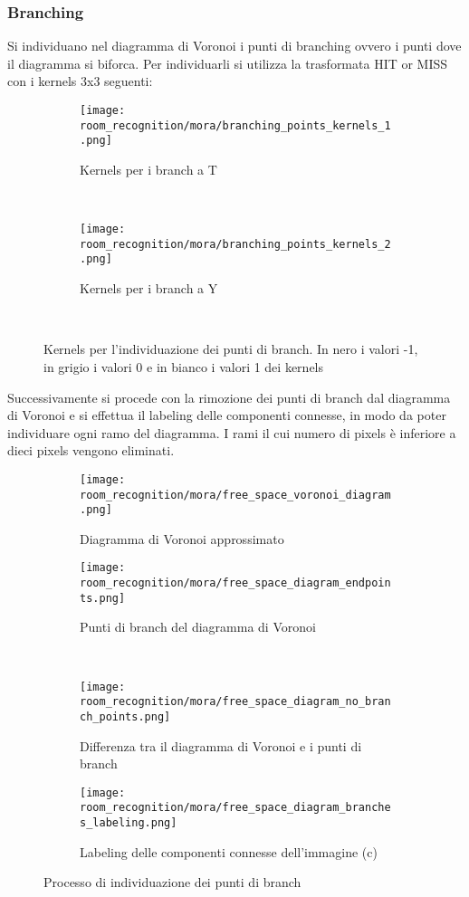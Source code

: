 \subsubsection{Branching}
Si individuano nel diagramma di Voronoi i punti di branching ovvero i punti dove il diagramma si biforca. Per individuarli si utilizza la trasformata HIT or MISS con i kernels 3x3 seguenti:
\begin{figure}[H]
  \centering
  \begin{subfigure}[t]{\textwidth}
    \centering
    \texttt{[image: room\_recognition/mora/branching\_points\_kernels\_1.png]}
    \caption{Kernels per i branch a T}
  \end{subfigure}\\
  \begin{subfigure}[t]{\textwidth}
    \centering
    \texttt{[image: room\_recognition/mora/branching\_points\_kernels\_2.png]}
    \caption{Kernels per i branch a Y}
  \end{subfigure}\\
  \caption{Kernels per l'individuazione dei punti di branch. In nero i valori -1, in grigio i valori 0 e in bianco i valori 1 dei kernels}
\end{figure}
\noindent
Successivamente si procede con la rimozione dei punti di branch dal diagramma di Voronoi e si effettua il {labeling delle componenti connesse}, in modo da poter individuare ogni ramo del diagramma. I rami il cui numero di pixels è inferiore a dieci pixels vengono eliminati.
\begin{figure}[H]
  \centering

  \begin{subfigure}[t]{.45\textwidth}
    \centering
    \texttt{[image: room\_recognition/mora/free\_space\_voronoi\_diagram.png]}
    \caption{Diagramma di Voronoi approssimato}
  \end{subfigure}
  \begin{subfigure}[t]{.45\textwidth}
    \centering
    \texttt{[image: room\_recognition/mora/free\_space\_diagram\_endpoints.png]}
    \caption{Punti di branch del diagramma di Voronoi}
  \end{subfigure}\\
  \begin{subfigure}[t]{.45\textwidth}
    \centering
    \texttt{[image: room\_recognition/mora/free\_space\_diagram\_no\_branch\_points.png]}
    \caption{Differenza tra il diagramma di Voronoi e i punti di branch}
  \end{subfigure}
  \begin{subfigure}[t]{.45\textwidth}
    \centering
    \texttt{[image: room\_recognition/mora/free\_space\_diagram\_branches\_labeling.png]}
    \caption{Labeling delle componenti connesse dell'immagine {(c)}}
  \end{subfigure}
  \caption{Processo di individuazione dei punti di branch}
\end{figure}

